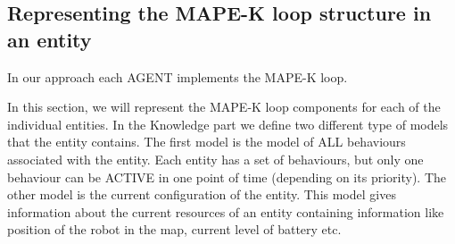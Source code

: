\documentclass[journal]{IEEEtran}
\theoremstyle{definition}
\begin{document}

\subsection{Representing the MAPE-K loop structure in an entity}
In our approach each AGENT implements the
MAPE-K loop. 


In this section, we will represent the MAPE-K loop components for each of the individual entities.
In the Knowledge part we define two different type of models that the entity contains. The first model is the model of ALL behaviours associated with the entity. Each entity has a set of behaviours, but only one behaviour can be ACTIVE in one point of time (depending on its priority).
The other model is the current configuration of the entity. This model gives information about the current resources of an entity containing information like position of the robot in the map, current level of battery etc.
\end{document}
